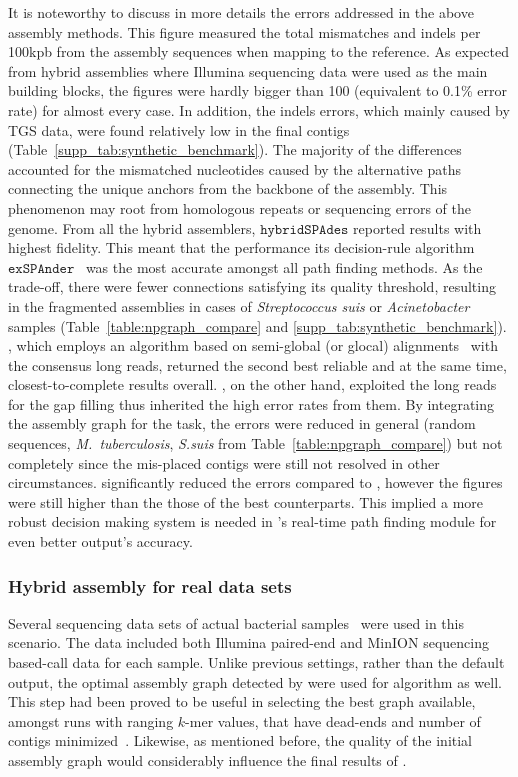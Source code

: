 It is noteworthy to discuss in more details the errors addressed in the above assembly methods.
This figure measured the total mismatches and indels per 100kpb from the assembly sequences when mapping to the reference.
As expected from hybrid assemblies where Illumina sequencing data were used as the main building blocks, the figures were hardly bigger than 100 (equivalent to 0.1\% error rate) for almost every case.
In addition, the indels errors, which mainly caused by TGS data, were found relatively low in the final contigs (Table~\ref{supp_tab:synthetic_benchmark}).
The majority of the differences accounted for the mismatched nucleotides caused by the alternative paths connecting the unique anchors from the backbone of the assembly.
This phenomenon may root from homologous repeats or sequencing errors of the genome.
From all the hybrid assemblers, $\mathtt{hybridSPAdes}$ reported results with highest fidelity. This meant that the performance its decision-rule algorithm $\mathtt{exSPAnder}$~\cite{Prjibelski2014} was the most accurate amongst all path finding methods. As the trade-off, there were fewer connections satisfying its quality threshold, resulting in the fragmented assemblies in cases of \emph{Streptococcus suis} or \emph{Acinetobacter} samples (Table~\ref{table:npgraph_compare} and \ref{supp_tab:synthetic_benchmark}).
\unicycler{}, which employs an algorithm based on semi-global (or glocal) alignments~\cite{Brudno2003glocal} with the consensus long reads, returned the second best reliable and at the same time, closest-to-complete results overall.
\npscarf{}, on the other hand, exploited the long reads for the gap filling thus inherited the high error rates from them.
By integrating the assembly graph for the task, the errors were reduced in general (random sequences, \emph{M.~tuberculosis}, \emph{S.suis} from Table~\ref{table:npgraph_compare}) but not completely since the mis-placed contigs were still not resolved in other circumstances.
\npgraph{} significantly reduced the errors compared to \npscarf{}, however the figures were still higher than the those of the best counterparts.
This implied a more robust decision making system is needed in \npgraph{}'s real-time path finding module for even better output's accuracy.

\subsubsection{Hybrid assembly for real data sets}
Several sequencing data sets of actual bacterial samples~\cite{George2017M14} were used in this scenario.
The data included both Illumina paired-end and MinION sequencing based-call data for each sample.
Unlike previous settings, rather than the default output, the optimal \spades{} assembly graph detected by \unicycler{} were used for \npgraph{} algorithm as well.
This step had been proved to be useful in selecting the best graph available, amongst \spades{} runs with ranging $k$-mer values, that have dead-ends and number of contigs minimized~\cite{Wick2017unicycler}. Likewise, as mentioned before, the quality of the initial assembly graph would considerably influence the final results of \npgraph{}. 

